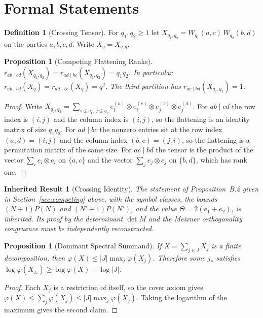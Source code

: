 \documentclass[11pt,letterpaper]{report}
\theoremstyle{plain}
\newtheorem{proposition}[theorem]{Proposition}
\newtheorem{inherited}[theorem]{Inherited Result}
\theoremstyle{definition}
\newtheorem{definition}[theorem]{Definition}
\theoremstyle{remark}
\begin{document}
\section{Formal Statements}

\begin{definition}[Crossing Tensor]
For $q_1,q_2\ge1$ let $X_{q_1,q_2}=W_{q_1}(a,c)\,W_{q_2}(b,d)$ on the parties $a,b,c,d$. Write $X_q=X_{q,q}$.
\end{definition}

\begin{proposition}[Competing Flattening Ranks]
$r_{ab\mid cd}(X_{q_1,q_2})=r_{ad\mid bc}(X_{q_1,q_2})=q_1q_2$. In particular $r_{ab\mid cd}(X_q)=r_{ad\mid bc}(X_q)=q^2$. The third partition has $r_{ac\mid bd}(X_{q_1,q_2})=1$.
\end{proposition}
\begin{proof}
Write $X_{q_1,q_2}=\sum_{i\le q_1,\,j\le q_2}e_i^{(a)}\otimes e_i^{(c)}\otimes e_j^{(b)}\otimes e_j^{(d)}$. For $ab\mid cd$ the row index is $(i,j)$ and the column index is $(i,j)$, so the flattening is an identity matrix of size $q_1q_2$. For $ad\mid bc$ the nonzero entries sit at the row index $(a,d)=(i,j)$ and the column index $(b,c)=(j,i)$, so the flattening is a permutation matrix of the same size. For $ac\mid bd$ the tensor is the product of the vector $\sum_ie_i\otimes e_i$ on $\{a,c\}$ and the vector $\sum_je_j\otimes e_j$ on $\{b,d\}$, which has rank one.
\end{proof}

\begin{inherited}[Crossing Identity]\label{inh:crossing}
The statement of Proposition~B.2 given in Section~\ref{sec:competing} above, with the symbol classes, the bounds $(N+1)P(N)$ and $(N'+1)P(N')$, and the value $\Theta=2(e_1+e_2)$, is inherited. Its proof by the determinant $\det M$ and the Meixner orthogonality congruence must be independently reconstructed.
\end{inherited}

\begin{proposition}[Dominant Spectral Summand]
If $X=\sum_{j\in J}X_j$ is a finite decomposition, then $\varphi(X)\le|J|\max_j\varphi(X_j)$. Therefore some $j_*$ satisfies $\log\varphi(X_{j_*})\ge\log\varphi(X)-\log|J|$.
\end{proposition}
\begin{proof}
Each $X_j$ is a restriction of itself, so the cover axiom gives $\varphi(X)\le\sum_j\varphi(X_j)\le|J|\max_j\varphi(X_j)$. Taking the logarithm of the maximum gives the second claim.
\end{proof}
\end{document}
